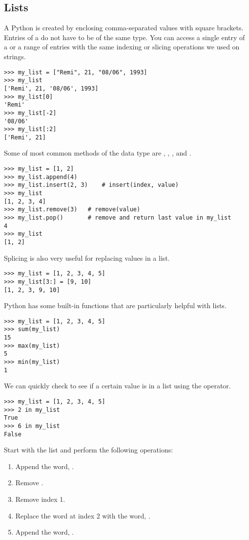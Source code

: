 
\subsection*{Lists}
A Python  is created by enclosing comma-separated values with square brackets. Entries of a  do not have to be of the same type. You can access a single entry of a  or a range of entries with the same indexing or slicing operations we used on strings. 
\begin{lstlisting}
>>> my_list = ["Remi", 21, "08/06", 1993]
>>> my_list
['Remi', 21, '08/06', 1993]
>>> my_list[0]
'Remi'
>>> my_list[-2]
'08/06'
>>> my_list[:2]
['Remi', 21]
\end{lstlisting}

Some of most common methods of the  data type are , , , and .
\begin{lstlisting}
>>> my_list = [1, 2]
>>> my_list.append(4)
>>> my_list.insert(2, 3)	# insert(index, value)
>>> my_list
[1, 2, 3, 4]
>>> my_list.remove(3)	# remove(value)
>>> my_list.pop()		# remove and return last value in my_list
4
>>> my_list
[1, 2]
\end{lstlisting}

Splicing is also very useful for replacing values in a list.
\begin{lstlisting}
>>> my_list = [1, 2, 3, 4, 5]
>>> my_list[3:] = [9, 10]
[1, 2, 3, 9, 10]
\end{lstlisting}

Python has some built-in functions that are particularly helpful with lists.
\begin{lstlisting}
>>> my_list = [1, 2, 3, 4, 5]
>>> sum(my_list)
15
>>> max(my_list)
5
>>> min(my_list)
1
\end{lstlisting}

We can quickly check to see if a certain value is in a list using the  operator.
\begin{lstlisting}
>>> my_list = [1, 2, 3, 4, 5]
>>> 2 in my_list
True
>>> 6 in my_list
False
\end{lstlisting}

\begin{problem}
Start with the list  and perform the following operations:
\begin{enumerate}
\item Append the word, .
\item Remove .
\item Remove index 1.
\item Replace the word at index 2 with the word, .
\item Append the word, .
\end{enumerate}
\end{problem}

